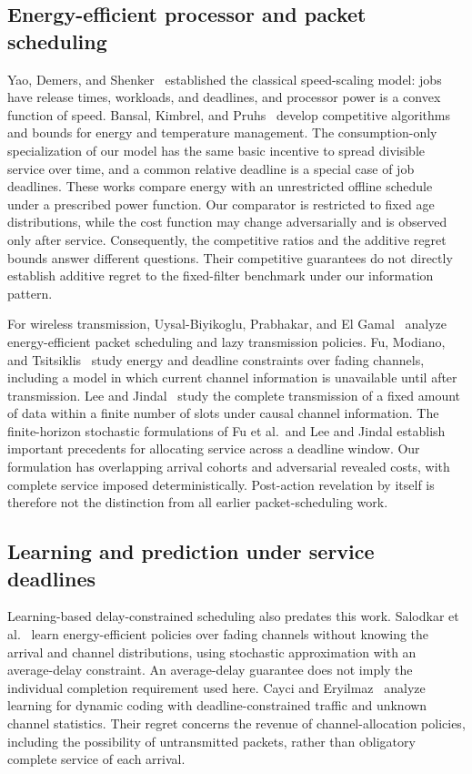 \documentclass[11pt]{article}
\theoremstyle{plain}
\theoremstyle{remark}
\numberwithin{equation}{section}
\begin{document}
\subsection{Energy-efficient processor and packet scheduling}

Yao, Demers, and Shenker~\cite{yao1995scheduling} established the classical
speed-scaling model: jobs have release times, workloads, and deadlines,
and processor power is a convex function of speed. Bansal, Kimbrel, and
Pruhs~\cite{bansal2007speed} develop competitive algorithms and bounds for
energy and temperature management. The consumption-only specialization
of our model has the same basic incentive to spread divisible service
over time, and a common relative deadline is a special case of job
deadlines. These works compare energy with an unrestricted offline
schedule under a prescribed power function. Our comparator is restricted
to fixed age distributions, while the cost function may change
adversarially and is observed only after service. Consequently, the
competitive ratios and the additive regret bounds answer different
questions. Their competitive guarantees do not directly establish
additive regret to the fixed-filter benchmark under our information pattern.

For wireless transmission, Uysal-Biyikoglu, Prabhakar, and
El Gamal~\cite{uysal2002energy} analyze energy-efficient packet scheduling
and lazy transmission policies. Fu, Modiano, and
Tsitsiklis~\cite{fu2006transmission} study energy and deadline constraints
over fading channels, including a model in which current channel
information is unavailable until after transmission. Lee and
Jindal~\cite{lee2009energy} study the complete transmission of a fixed
amount of data within a finite number of slots under causal channel
information. The finite-horizon stochastic formulations of Fu et al.\
and Lee and Jindal establish important precedents for allocating service
across a deadline window. Our formulation has overlapping arrival cohorts
and adversarial revealed costs, with complete service imposed
deterministically. Post-action revelation by itself is therefore not
the distinction from all earlier packet-scheduling work.

\subsection{Learning and prediction under service deadlines}

Learning-based delay-constrained scheduling also predates this work.
Salodkar et al.~\cite{salodkar2008learning} learn energy-efficient policies
over fading channels without knowing the arrival and channel
distributions, using stochastic approximation with an average-delay
constraint. An average-delay guarantee does not imply the individual
completion requirement used here. Cayci and
Eryilmaz~\cite{cayci2019coding} analyze learning for dynamic coding with
deadline-constrained traffic and unknown channel statistics. Their regret
concerns the revenue of channel-allocation policies, including the
possibility of untransmitted packets, rather than obligatory complete
service of each arrival.
\end{document}
